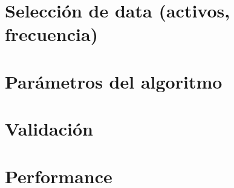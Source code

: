 \section{Selección de data (activos, frecuencia)}
\section{Parámetros del algoritmo}
\section{Validación}
\section{Performance}
